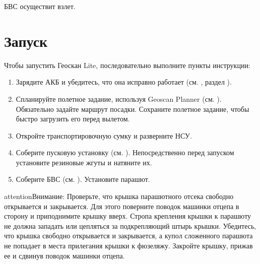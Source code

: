 \documentclass[a4paper,10pt,russian,openany]{sphinxmanual}
\begin{document}
БВС осуществит взлет.


\chapter{Запуск}
\label{\detokenize{launch:id1}}\label{\detokenize{launch::doc}}
Чтобы запустить Геоскан Lite, последовательно выполните пункты инструкции:
\begin{enumerate}
\def\theenumi{\arabic{enumi}}
\def\labelenumi{\theenumi )}
\makeatletter\def\p@enumii{\p@enumi \theenumi )}\makeatother
\item {} 
Зарядите АКБ и убедитесь, что она исправно работает (см. {\hyperref[\detokenize{charger::doc}]{}}, раздел ).

\item {} 
Спланируйте полетное задание, используя Geoscan Planner (см. {\hyperref[\detokenize{planner::doc}]{}}). Обязательно задайте маршрут посадки. Сохраните полетное задание, чтобы быстро загрузить его перед вылетом.

\item {} 
Откройте транспортировочную сумку и разверните НСУ.

\item {} 
Соберите пусковую установку (см. {\hyperref[\detokenize{catapult::doc}]{}}). Непосредственно перед запуском установите резиновые жгуты и натяните их.

\item {} 
Соберите БВС (см. {\hyperref[\detokenize{uav::doc}]{}}). Установите парашют.

\end{enumerate}

\begin{sphinxadmonition}{attention}{Внимание:}
Проверьте, что крышка парашютного отсека свободно открывается и закрывается. Для этого поверните поводок машинки отцепа в сторону и приподнимите крышку вверх. Стропа крепления крышки к парашюту не должна западать или цепляться за подкрепляющий штырь крышки. Убедитесь, что крышка свободно открывается и закрывается, а купол сложенного парашюта не попадает в места прилегания крышки к фюзеляжу. Закройте крышку, прижав ее и сдвинув поводок машинки отцепа.
\end{sphinxadmonition}
\end{document}
